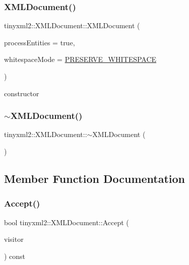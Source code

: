 \subsubsection{\texorpdfstring{X\+M\+L\+Document()}{XMLDocument()}}
{\footnotesize\ttfamily tinyxml2\+::\+X\+M\+L\+Document\+::\+X\+M\+L\+Document (\begin{DoxyParamCaption}\item[{bool}]{process\+Entities = {\ttfamily true},  }\item[{\mbox{\hyperlink{namespacetinyxml2_a7f91d00f77360f850fd5da0861e27dd5}{Whitespace}}}]{whitespace\+Mode = {\ttfamily \mbox{\hyperlink{namespacetinyxml2_a7f91d00f77360f850fd5da0861e27dd5a751769aa625fe5fe5286e9779edec56a}{P\+R\+E\+S\+E\+R\+V\+E\+\_\+\+W\+H\+I\+T\+E\+S\+P\+A\+CE}}} }\end{DoxyParamCaption})}



constructor 

\mbox{\label{classtinyxml2_1_1_x_m_l_document_af37c47d8e2ba4b2fc81b21a77a32579b}} 
\subsubsection{\texorpdfstring{$\sim$\+X\+M\+L\+Document()}{~XMLDocument()}}
{\footnotesize\ttfamily tinyxml2\+::\+X\+M\+L\+Document\+::$\sim$\+X\+M\+L\+Document (\begin{DoxyParamCaption}{ }\end{DoxyParamCaption})}



\subsection{Member Function Documentation}
\mbox{\label{classtinyxml2_1_1_x_m_l_document_ab7be651917a35ab1ff0e4e6d4e565cdf}} 
\subsubsection{\texorpdfstring{Accept()}{Accept()}}
{\footnotesize\ttfamily bool tinyxml2\+::\+X\+M\+L\+Document\+::\+Accept (\begin{DoxyParamCaption}\item[{\mbox{\hyperlink{classtinyxml2_1_1_x_m_l_visitor}{X\+M\+L\+Visitor}} $\ast$}]{visitor }\end{DoxyParamCaption}) const\hspace{0.3cm}{\ttfamily [virtual]}}

